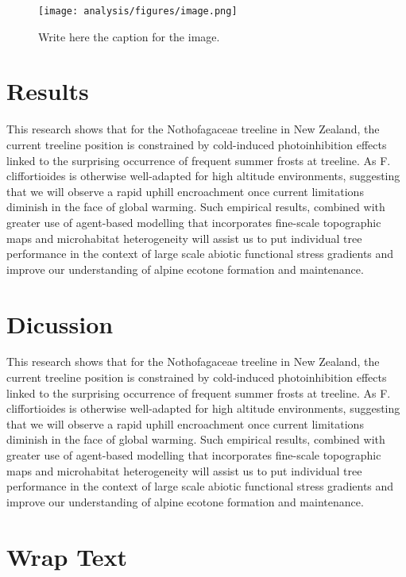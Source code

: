 \documentclass[12pt]{article}
\begin{document}

\begin{figure}[ht]  %
\centering %
\texttt{[image: analysis/figures/image.png]}
\caption{Write here the caption for the image.}
\label{fig:image}
\end{figure}


\section{Results}


\noindent This research shows that for the Nothofagaceae treeline in New Zealand, the current treeline position is constrained by cold-induced photoinhibition effects linked to the surprising occurrence of frequent summer frosts at treeline. As F. cliffortioides is otherwise well-adapted for high altitude environments, suggesting that we will observe a rapid uphill encroachment once current limitations diminish in the face of global warming. Such empirical results, combined with greater use of agent-based modelling that incorporates fine-scale topographic maps and microhabitat heterogeneity will assist us to put individual tree performance in the context of large scale abiotic functional stress gradients and improve our understanding of alpine ecotone formation and maintenance.



\section{Dicussion}


\noindent This research shows that for the Nothofagaceae treeline in New Zealand, the current treeline position is constrained by cold-induced photoinhibition effects linked to the surprising occurrence of frequent summer frosts at treeline. As F. cliffortioides is otherwise well-adapted for high altitude environments, suggesting that we will observe a rapid uphill encroachment once current limitations diminish in the face of global warming. Such empirical results, combined with greater use of agent-based modelling that incorporates fine-scale topographic maps and microhabitat heterogeneity will assist us to put individual tree performance in the context of large scale abiotic functional stress gradients and improve our understanding of alpine ecotone formation and maintenance.


\section{Wrap Text}
\end{document}
